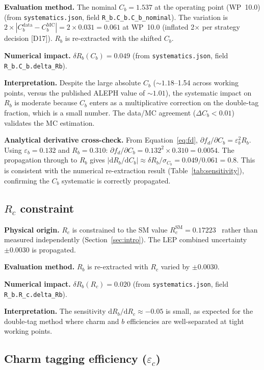 \documentclass[11pt,a4paper]{article}
\begin{document}
\textbf{Evaluation method.} The nominal $C_b = 1.537$ at the operating point (WP~10.0)
(from \texttt{systematics.json}, field \texttt{R\_b.C\_b.C\_b\_nominal}). The variation
is $2 \times |C_b^\mathrm{data} - C_b^\mathrm{MC}| = 2 \times 0.031 = 0.061$ at WP~10.0
(inflated 2$\times$ per strategy decision [D17]).
$R_b$ is re-extracted with the shifted $C_b$.

\textbf{Numerical impact.}
$\delta R_b(C_b) = 0.049$
(from \texttt{systematics.json}, field \texttt{R\_b.C\_b.delta\_Rb}).

\textbf{Interpretation.} Despite the large absolute $C_b$ ($\sim 1.18$--1.54 across
working points, versus the published ALEPH value of $\sim 1.01$), the systematic impact
on $R_b$ is moderate because $C_b$ enters as a multiplicative correction on the
double-tag fraction, which is a small number. The data/MC agreement ($\Delta C_b < 0.01$)
validates the MC estimation.

\textbf{Analytical derivative cross-check.}
From Equation~\ref{eq:fd}, $\partial f_d / \partial C_b = \varepsilon_b^2 R_b$.
Using $\varepsilon_b = 0.132$ and $R_b = 0.310$:
$\partial f_d / \partial C_b = 0.132^2 \times 0.310 = 0.0054$.
The propagation through to $R_b$ gives
$|\mathrm{d}R_b/\mathrm{d}C_b| \approx \delta R_b / \sigma_{C_b} = 0.049 / 0.061 = 0.8$.
This is consistent with the numerical re-extraction result (Table~\ref{tab:sensitivity}),
confirming the $C_b$ systematic is correctly propagated.

\subsection{$R_c$ constraint}
\label{sec:syst_rc}

\textbf{Physical origin.} $R_c$ is constrained to the SM value
$R_c^\mathrm{SM} = 0.17223$~\cite{LEP:EWWG:2005} rather than measured independently
(Section~\ref{sec:intro}). The LEP combined uncertainty $\pm 0.0030$ is propagated.

\textbf{Evaluation method.} $R_b$ is re-extracted with $R_c$ varied by $\pm 0.0030$.

\textbf{Numerical impact.}
$\delta R_b(R_c) = 0.020$
(from \texttt{systematics.json}, field \texttt{R\_b.R\_c.delta\_Rb}).

\textbf{Interpretation.} The sensitivity $\mathrm{d}R_b/\mathrm{d}R_c \approx -0.05$
is small, as expected for the double-tag method where charm and $b$ efficiencies are
well-separated at tight working points.

\subsection{Charm tagging efficiency ($\varepsilon_c$)}
\label{sec:syst_eps_c}
\end{document}
